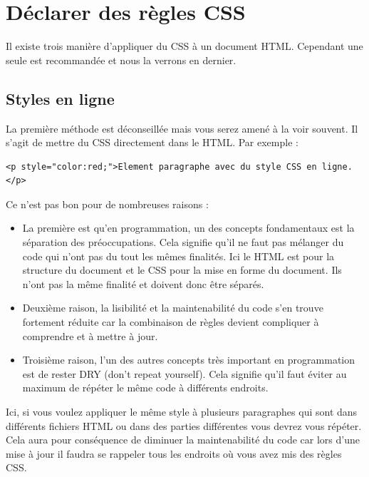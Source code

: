 \documentclass[a4paper]{article}
\begin{document}

\section{Déclarer des règles CSS}
Il existe trois manière d'appliquer du {\color{monOrange}CSS} à un document {\color{monOrange}HTML}. Cependant une seule est recommandée et nous la verrons en dernier.

\subsection{Styles en ligne}
La première méthode est déconseillée mais vous serez amené à la voir souvent. Il s'agit de mettre du {\color{monOrange}CSS} directement dans le {\color{monOrange}HTML}. Par exemple :
\begin{verbatim}
<p style="color:red;">Element paragraphe avec du style CSS en ligne.</p>
\end{verbatim}
Ce n'est pas bon pour de nombreuses raisons :
\begin{itemize}
\item La première est qu'en programmation, un des concepts fondamentaux est la séparation des préoccupations. Cela signifie qu'il ne faut pas mélanger du code qui n'ont pas du tout les mêmes finalités. Ici le {\color{monOrange}HTML} est pour la structure du {\color{monOrange}document} et le {\color{monOrange}CSS} pour la mise en forme du {\color{monOrange}document}. Ils n'ont pas la même finalité et doivent donc être séparés.

\item Deuxième raison, la lisibilité et la maintenabilité du code s'en trouve fortement réduite car la combinaison de règles devient compliquer à comprendre et à mettre à jour. 
\item Troisième raison, l'un des autres concepts très important en programmation est de rester {\color{monOrange}DRY (don't repeat yourself)}. Cela signifie qu'il faut éviter au maximum de répéter le même code à différents endroits.
\end{itemize}
Ici, si vous voulez appliquer le même style à plusieurs paragraphes qui sont dans différents fichiers {\color{monOrange}HTML} ou dans des parties différentes vous devrez vous répéter. Cela aura pour conséquence de diminuer la maintenabilité du code car lors d'une mise à jour il faudra se rappeler tous les endroits où vous avez mis des règles {\color{monOrange}CSS}.
\end{document}
